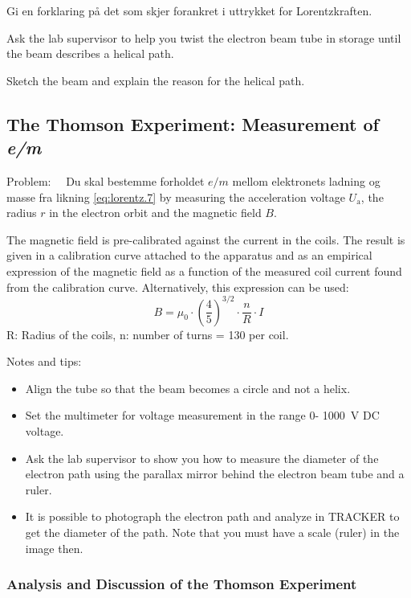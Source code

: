 \documentclass[../Elmag-labhefte-2020.tex]{subfiles}
\begin{document}
{\itsf Gi en forklaring på det som skjer forankret i uttrykket for Lorentzkraften. }

Ask the lab supervisor to help you twist the electron beam tube in storage until the beam describes a helical path.

{\itsf Sketch the beam and explain the reason for the helical path.}

\subsection{The Thomson Experiment: Measurement of \textsl{e/m}}

Problem: \ \
{\itsf Du skal bestemme forholdet $e/m$ mellom elektronets ladning og masse fra likning \eqref{eq:lorentz.7} by measuring the acceleration voltage $U_\mathrm{a}$, the radius $r$ in the electron orbit and the magnetic field $B$.}

The magnetic field is pre-calibrated against the current in the coils. The result is given in a calibration curve attached to the apparatus and as an empirical expression of the magnetic field as a function of the measured coil current found from the calibration curve. Alternatively, this expression can be used:
\begin{equation}
    B=\mu_0 \cdot (\frac{4}{5})^{3/2}\cdot \frac{n}{R} \cdot I
\end{equation}
R: Radius of the coils, n: number of turns = 130 per coil.

Notes and tips:
\vspace{-4mm}
\begin{itemize}
    \item Align the tube so that the beam becomes a circle and not a helix.
    \item Set the multimeter for voltage measurement in the range 0- \SI{1000}{\volt} DC voltage.
    \item Ask the lab supervisor to show you how to measure the diameter of the electron path using the parallax mirror behind the electron beam tube and a ruler.
    \item It is possible to photograph the electron path and analyze in TRACKER to get the diameter of the path. Note that you must have a scale (ruler) in the image then.
\end{itemize}

\subsubsection{Analysis and Discussion of the Thomson Experiment}
\end{document}
